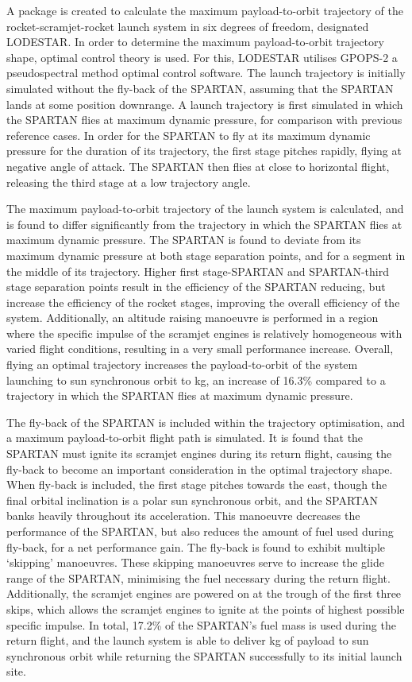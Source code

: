  A package is created to calculate the maximum payload-to-orbit trajectory of the rocket-scramjet-rocket launch system in six degrees of freedom, designated LODESTAR.
 In order to determine the maximum payload-to-orbit trajectory shape, optimal control theory is used. For this, LODESTAR utilises GPOPS-2 a pseudospectral method optimal control software. 
 The launch trajectory is initially simulated without the fly-back of the SPARTAN, assuming that the SPARTAN lands at some position downrange. A launch trajectory is first simulated in which the SPARTAN flies at maximum dynamic pressure, for comparison with previous reference cases. In order for the SPARTAN to fly at its maximum dynamic pressure for the duration of its trajectory, the first stage pitches rapidly, flying at negative angle of attack. The SPARTAN then flies at close to horizontal flight, releasing the third stage at a low trajectory angle. 
 
The maximum payload-to-orbit trajectory of the launch system is calculated, and is found to differ significantly from the trajectory in which the SPARTAN flies at maximum dynamic pressure. 
 The SPARTAN is found to deviate from its maximum dynamic pressure at both stage separation points, and for a segment in the middle of its trajectory.
 Higher first stage-SPARTAN and SPARTAN-third stage separation points result in the efficiency of the SPARTAN reducing, but increase the efficiency of the rocket stages, improving the overall efficiency of the system. 
  Additionally, an altitude raising manoeuvre is performed in a region where the specific impulse of the scramjet engines is relatively homogeneous with varied flight conditions, resulting in a very small performance increase. Overall, flying an optimal trajectory increases the payload-to-orbit of the system launching to sun synchronous orbit to \PayloadToOrbitStandardNoReturn kg, an increase of 16.3\% compared to a trajectory in which the SPARTAN flies at maximum dynamic pressure.  
 
 
 The fly-back of the SPARTAN is included within the trajectory optimisation, and a maximum payload-to-orbit flight path is simulated. 
 It is found that the SPARTAN must ignite its scramjet engines during its return flight, causing the fly-back to become an important consideration in the optimal trajectory shape. When fly-back is included, the first stage pitches towards the east, though the final orbital inclination is a polar sun synchronous orbit, and the SPARTAN banks heavily throughout its acceleration. This manoeuvre decreases the performance of the SPARTAN, but also reduces the amount of fuel used during fly-back, for a net performance gain. 
The fly-back is found to exhibit multiple `skipping' manoeuvres. These skipping manoeuvres serve to increase the glide range of the SPARTAN, minimising the fuel necessary during the return flight. Additionally, the scramjet engines are powered on at the trough of the first three skips, which allows the scramjet engines to ignite at the points of highest possible specific impulse. In total, 17.2\% of the SPARTAN's fuel mass is used during the return flight, and the launch system is able to deliver \PayloadToOrbitStandard kg of payload to sun synchronous orbit while returning the SPARTAN successfully to its initial launch site.


